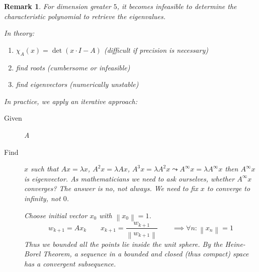 \documentclass{article}
\newcounter{lecref}[section]
\numberwithin{lecref}{section}
\newtheorem{remark}[lecref]{Remark}
\newcommand{\norm}[1]{\left\|#1\right\|}
\begin{document}
\begin{remark} %
  For dimension greater $5$, it becomes infeasible to determine the characteristic polynomial to retrieve the eigenvalues.

  In theory:
  \begin{enumerate}
    \item $\chi_A(x) = \det(x \cdot I - A)$ (difficult if precision is necessary)
    \item find roots (cumbersome or infeasible)
    \item find eigenvectors (numerically unstable)
  \end{enumerate}

  In practice, we apply an iterative approach:
  \begin{description}
    \item[Given] A
    \item[Find] $x$ such that $Ax = \lambda x$, $A^2 x = \lambda Ax$, $A^3 x = \lambda A^2 x \leadsto A^\infty x = \lambda A^\infty x$ then $A^\infty x$ is eigenvector. As mathematicians we need to ask ourselves, whether $A^\infty x$ converges? The answer is no, not always. We need to fix $x$ to converge to infinity, not $0$.

    Choose initial vector $x_0$ with $\norm{x_0} = 1$.
    \[ w_{k+1} = Ax_k \qquad x_{k+1} = \frac{w_{k+1}}{\norm{w_{k+1}}} \qquad \implies \forall n: \norm{x_n} = 1 \]
    Thus we bounded all the points lie inside the unit sphere.
    By the Heine-Borel Theorem, a sequence in a bounded and closed (thus compact) space has a convergent subsequence.


\end{description}
\end{remark}
\end{document}
